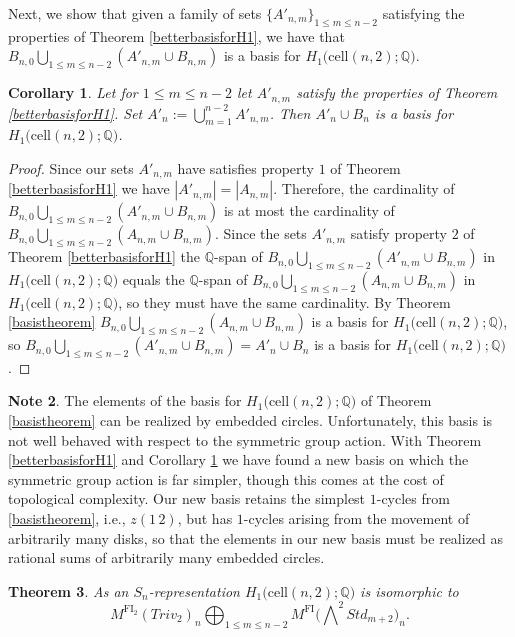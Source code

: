 \documentclass[12py]{amsart}%
\newtheorem{thm}{Theorem}[section]
\newtheorem{cor}[thm]{Corollary}
\theoremstyle{definition}\newtheorem{definition}[thm]{Definition}
\theoremstyle{definition}
\newtheorem{note}[thm]{Note}
\newcommand{\Q}{\ensuremath{\mathbb{Q}}}
\begin{document}
Next, we show that given a family of sets $\{A'_{n,m}\}_{1\le m\le n-2}$ satisfying the properties of Theorem \ref{betterbasisforH1}, we have that $B_{n,0}\bigcup_{1\le m\le n-2}(A'_{n,m}\cup B_{n,m})$ is a basis for $H_{1}\big(\text{cell}(n,2);\Q\big)$.

\begin{cor}\label{isabasisforH1}
Let for $1\le m\le n-2$ let  $A'_{n,m}$ satisfy the properties of Theorem \ref{betterbasisforH1}. Set $A'_{n}:=\bigcup_{m=1}^{n-2}A'_{n,m}$. Then $A'_{n}\cup B_{n}$ is a basis for $H_{1}\big(\text{cell}(n,2);\Q\big)$.
\end{cor}

\begin{proof}
Since our sets $A'_{n,m}$ have satisfies property $1$ of Theorem \ref{betterbasisforH1} we have $|A'_{n,m}|=|A_{n,m}|$. Therefore, the cardinality of $B_{n,0}\bigcup_{1\le m\le n-2}(A'_{n,m}\cup B_{n,m})$ is at most the cardinality of $B_{n,0}\bigcup_{1\le m\le n-2}(A_{n,m}\cup B_{n,m})$. Since the sets $A'_{n,m}$ satisfy property $2$ of Theorem \ref{betterbasisforH1} the $\Q$-span of $B_{n,0}\bigcup_{1\le m\le n-2}(A'_{n,m}\cup B_{n,m})$ in $H_{1}\big(\text{cell}(n, 2);\Q\big)$ equals the $\Q$-span of $B_{n,0}\bigcup_{1\le m\le n-2}(A_{n,m}\cup B_{n,m})$ in $H_{1}\big(\text{cell}(n, 2);\Q\big)$, so they must have the same cardinality. By Theorem \ref{basistheorem} $B_{n,0}\bigcup_{1\le m\le n-2}(A_{n,m}\cup B_{n,m})$ is a basis for $H_{1}\big(\text{cell}(n,2);\Q\big)$, so $B_{n,0}\bigcup_{1\le m\le n-2}(A'_{n,m}\cup B_{n,m})=A'_{n}\cup B_{n}$ is a basis for $H_{1}\big(\text{cell}(n,2);\Q\big)$.
\end{proof}

\begin{note}
The elements of the basis for $H_{1}\big(\text{cell}(n,2);\Q\big)$ of Theorem \ref{basistheorem} can be realized by embedded circles. Unfortunately, this basis is not well behaved with respect to the symmetric group action. With Theorem \ref{betterbasisforH1} and Corollary \ref{isabasisforH1} we have found a new basis on which the symmetric group action is far simpler, though this comes at the cost of topological complexity. Our new basis retains the simplest $1$-cycles from \ref{basistheorem}, i.e., $z(1\,2)$, but has $1$-cycles arising from the movement of arbitrarily many disks, so that the elements in our new basis must be realized as rational sums of arbitrarily many embedded circles.
\end{note}

\begin{thm}\label{repstructofH1}
As an $S_{n}$-representation $H_{1}\big(\text{cell}(n,2);\Q\big)$ is isomorphic to 
\[
M^{\text{FI}_{2}}(Triv_{2})_{n}\bigoplus_{1\le m\le n-2}M^{\text{FI}}\Big(\bigwedge\nolimits^{2}Std_{m+2}\Big)_{n}.
\]
\end{thm}
\end{document}
